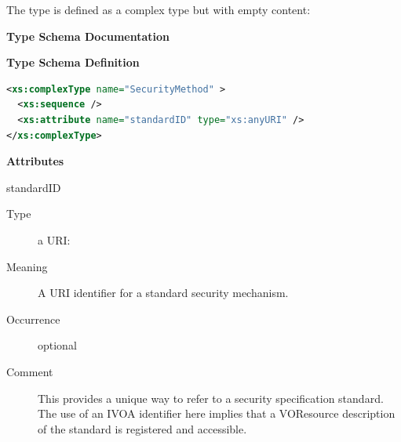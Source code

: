\documentclass[11pt,a4paper]{ivoa}
\begin{document}


The  type is
defined as a complex type but with empty content:


\begin{generated}
\begingroup
      	\renewcommand*\descriptionlabel[1]{%
      	\hbox to 5.5em{\emph{#1}\hfil}}\vspace{2ex}\noindent\textbf{ Type Schema Documentation}



\vspace{1ex}\noindent\textbf{ Type Schema Definition}

\begin{lstlisting}[language=XML,basicstyle=\footnotesize]
<xs:complexType name="SecurityMethod" >
  <xs:sequence />
  <xs:attribute name="standardID" type="xs:anyURI" />
</xs:complexType>
\end{lstlisting}

\vspace{0.5ex}\noindent\textbf{ Attributes}

\begingroup\small\begin{bigdescription}
\item[standardID]
\begin{description}
\item[Type] a URI: 
\item[Meaning] 
               A URI identifier for a standard security mechanism. 
            
\item[Occurrence] optional
\item[Comment] 
               This provides a unique way to refer to a security
               specification standard.  The use of an IVOA identifier here 
               implies that a VOResource description of the standard is 
               registered and accessible.  
            
\end{description}


\end{bigdescription}\endgroup

\endgroup
\end{generated}
\end{document}
